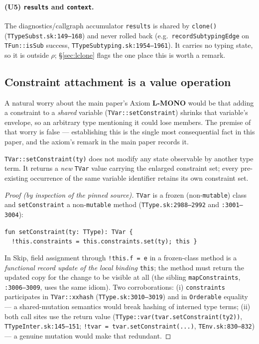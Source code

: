 \documentclass[11pt]{article}
\begin{document}
\paragraph{(U5) \texttt{results} and \texttt{context}.}
The diagnostics/callgraph accumulator \texttt{results} is shared by
\texttt{clone()} (\texttt{TTypeSubst.sk:149--168}) and never rolled back
(e.g.\ \texttt{recordSubtypingEdge} on \texttt{TFun::isSub} success,
\texttt{TTypeSubtyping.sk:1954--1961}). It carries no typing state, so it
is outside $\rho$; \S\ref{sec:lclone} flags the one place this is worth a
remark.

\subsection{Constraint attachment is a value operation}
\label{sec:setconstraint}

A natural worry about the main paper's Axiom \textbf{L-MONO} would be
that adding a constraint to a \emph{shared} variable
(\texttt{TVar::setConstraint}) shrinks that variable's envelope, so an
arbitrary type mentioning it could lose members. The premise of that
worry is false — establishing this is the single most consequential fact
in this paper, and the axiom's remark in the main paper records it.

\begin{lemma}
\label{lem:setconstraint}
\texttt{TVar::setConstraint(ty)} does not modify any state observable by
another type term. It returns a \emph{new} \texttt{TVar} value carrying
the enlarged constraint set; every pre-existing occurrence of the same
variable identifier retains its own constraint set.
\end{lemma}
\begin{proof}[Proof (by inspection of the pinned source)]
\texttt{TVar} is a frozen (non-\texttt{mutable}) class and
\texttt{setConstraint} a non-\texttt{mutable} method
(\texttt{TType.sk:2988--2992} and \texttt{:3001--3004}):
\begin{center}
\texttt{fun setConstraint(ty: TType): TVar \{}\\
\texttt{\ \ !this.constraints = this.constraints.set(ty); this \}}
\end{center}
In Skip, field assignment through \texttt{!this.f = e} in a frozen-class
method is a \emph{functional record update of the local binding}
\texttt{this}; the method must return the updated copy for the change to
be visible at all (the sibling \texttt{mapConstraints},
\texttt{:3006--3009}, uses the same idiom). Two corroborations: (i)
\texttt{constraints}
participates in \texttt{TVar::xxhash} (\texttt{TType.sk:3010--3019}) and
in \texttt{Orderable} equality — a shared-mutation semantics would break
hashing of interned type terms; (ii) both call sites use the return value
(\texttt{TType::var(tvar.setConstraint(ty2))},
\texttt{TTypeInter.sk:145--151}; \texttt{!tvar = tvar.setConstraint(...)},
\texttt{TEnv.sk:830--832}) — a genuine mutation would make that redundant.
\end{proof}
\end{document}
